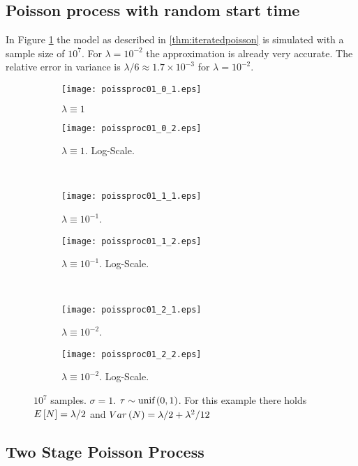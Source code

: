 \documentclass{amsart}
\numberwithin{equation}{section}
\begin{document}
\subsection{Poisson process with random start time}
\label{sec:numPoissProcOne}
In Figure \ref{fig:numPoissProcOne} the model as described in \autoref{thm:iteratedpoisson} is simulated with a sample size of $10^7$. For $\lambda = 10^{-2}$ the approximation is already very accurate. The relative error in variance is $\lambda/6 \approx 1.7 \times 10^{-3}$ for $\lambda = 10^{-2}$.
\begin{figure}[ht]
    \centering
    \begin{subfigure}[t]{0.475\textwidth}
        \centering
        \texttt{[image: poissproc01\_0\_1.eps]}
        \caption{$\lambda \equiv 1$}
    \end{subfigure}
    \hfill
    \begin{subfigure}[t]{0.475\textwidth}
        \centering
        \texttt{[image: poissproc01\_0\_2.eps]}
        \caption{$\lambda \equiv 1$. Log-Scale.}
    \end{subfigure}
    \\
    \begin{subfigure}[t]{0.475\textwidth}
        \centering
        \texttt{[image: poissproc01\_1\_1.eps]}
        \caption{$\lambda \equiv 10^{-1}$.}
    \end{subfigure}
    \hfill
    \begin{subfigure}[t]{0.475\textwidth}
        \centering
        \texttt{[image: poissproc01\_1\_2.eps]}
        \caption{$\lambda \equiv 10^{-1}$. Log-Scale.}
    \end{subfigure}
    \\
    \begin{subfigure}[t]{0.475\textwidth}
        \centering
        \texttt{[image: poissproc01\_2\_1.eps]}
        \caption{$\lambda \equiv 10^{-2}$.}
    \end{subfigure}
    \hfill
    \begin{subfigure}[t]{0.475\textwidth}
        \centering
        \texttt{[image: poissproc01\_2\_2.eps]}
        \caption{$\lambda \equiv 10^{-2}$. Log-Scale.}
    \end{subfigure}
    \caption{$10^7$ samples. $\sigma = 1$. $\tau \sim \text{unif}\left(0,1\right)$. For this example there holds $E\left[N\right] = \lambda / 2$ and $Var\left(N\right) = \lambda/2 + \lambda^2/12$}
    \label{fig:numPoissProcOne}
\end{figure}


\subsection{Two Stage Poisson Process}
\label{sec:numPoissProcTwo}


\newpage
\printbibliography
\end{document}
